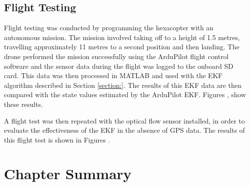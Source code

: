 \subsection{Flight Testing}
Flight testing was conducted by programming the hexacopter with an autonomous mission. The mission involved taking off to a height of 1.5 metres, travelling approximately 11 metres to a second position and then landing. The drone performed the mission successfully using the ArduPilot flight control software and the sensor data during the flight was logged to the onboard SD card. This data was then processed in MATLAB and used with the EKF algorithm described in Section \ref{section:}. The results of this EKF data are then compared with the state values estimated by the ArduPilot EKF. Figures \figref{}, \figref{} show these results.

A flight test was then repeated with the optical flow sensor installed, in order to evaluate the effectiveness of the EKF in the absence of GPS data. The results of this flight test is shown in Figures \figref{}.

\section{Chapter Summary}

\clearpage


